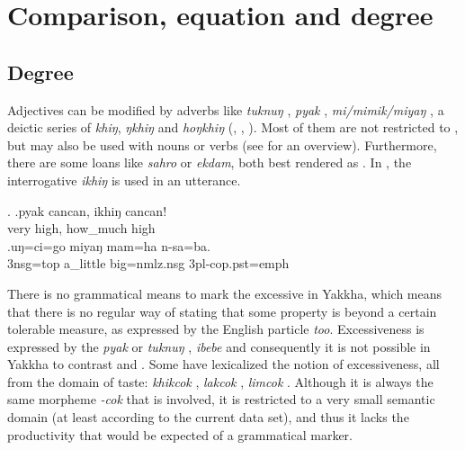 \section{Comparison, equation and degree}\label{sec-compar}
\subsection{Degree}

Adjectives can be modified by  adverbs like \emph{tuknuŋ} , \emph{pyak} , \emph{mi/mimik/miyaŋ} , a deictic series of \emph{khiŋ}, \emph{ŋkhiŋ} and \emph{hoŋkhiŋ} (, , ). Most of them are not restricted to , but may also be used with nouns or verbs (see  for an overview). Furthermore, there are some  loans like \emph{sahro} or \emph{ekdam}, both best rendered as . In \Next[a], the interrogative \emph{ikhiŋ}  is used in an  utterance. 

\ex. \ag.pyak cancan, ikhiŋ   cancan!\\
		very high, how\_much high\\
	 
 	\bg.uŋ=ci=go  miyaŋ mam=ha n-sa=ba.\\
	{\sc 3nsg=top} a\_little big{\sc =nmlz.nsg} {\sc 3pl-cop.pst=emph}\\
	 

	
There is no grammatical means to mark the excessive in Yakkha, which means that there is no regular way of stating that some property is beyond a certain tolerable measure, as expressed by the English particle \emph{too}. Excessiveness is expressed by the  \emph{pyak}  or 
\emph{tuknuŋ} , \emph{ibebe}  and consequently it is not possible in Yakkha to contrast  and . Some  have lexicalized the notion of excessiveness, all from the  domain of taste: \emph{khikcok} , \emph{lakcok} , \emph{limcok} . Although it is  always the same morpheme \emph{-cok} that is involved, it is restricted to a very small semantic domain (at least according to the current data set), and thus it lacks the productivity that would be expected of a grammatical marker.


